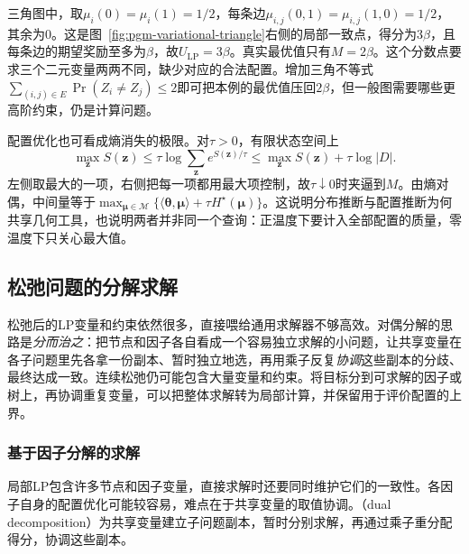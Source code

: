 三角图中，取$\mu_i(0)=\mu_i(1)=1/2$，每条边$\mu_{i,j}(0,1)=\mu_{i,j}(1,0)=1/2$，其余为$0$。这是图~\ref{fig:pgm-variational-triangle}右侧的局部一致点，得分为$3\beta$，且每条边的期望奖励至多为$\beta$，故$U_{\mathrm{LP}}=3\beta$。真实最优值只有$M=2\beta$。这个分数点要求三个二元变量两两不同，缺少对应的合法配置。增加三角不等式$\sum_{(i,j)\in E}\Pr(Z_i\ne Z_j)\leq2$即可把本例的最优值压回$2\beta$，但一般图需要哪些更高阶约束，仍是计算问题。

配置优化也可看成熵消失的极限。对$\tau>0$，有限状态空间上
\[
  \max_{\bm z}S(\bm z)
  \leq \tau\log\sum_{\bm z}e^{S(\bm z)/\tau}
  \leq \max_{\bm z}S(\bm z)+\tau\log|D|.
\]
左侧取最大的一项，右侧把每一项都用最大项控制，故$\tau\downarrow0$时夹逼到$M$。由熵对偶，中间量等于$\max_{\bm{\mu}\in\mathcal M}\{\langle\bm{\theta},\bm{\mu}\rangle+\tau H^\star(\bm{\mu})\}$。这说明分布推断与配置推断为何共享几何工具，也说明两者并非同一个查询：正温度下要计入全部配置的质量，零温度下只关心最大值。

\subsection{松弛问题的分解求解}
\label{sec:pgm-variational-decomposed-solving}

松弛后的LP变量和约束依然很多，直接喂给通用求解器不够高效。对偶分解的思路是\emph{分而治之}：把节点和因子各自看成一个容易独立求解的小问题，让共享变量在各子问题里先各拿一份副本、暂时独立地选，再用乘子反复\emph{协调}这些副本的分歧、最终达成一致。连续松弛仍可能包含大量变量和约束。将目标分到可求解的因子或树上，再协调重复变量，可以把整体求解转为局部计算，并保留用于评价配置的上界。

\subsubsection{基于因子分解的求解}

\label{sec:pgm-variational-dual-decomposition}
\label{sec:pgm-variational-dual-trw}

局部LP包含许多节点和因子变量，直接求解时还要同时维护它们的一致性。各因子自身的配置优化可能较容易，难点在于共享变量的取值协调。（dual decomposition）为共享变量建立子问题副本，暂时分别求解，再通过乘子重分配得分，协调这些副本。


